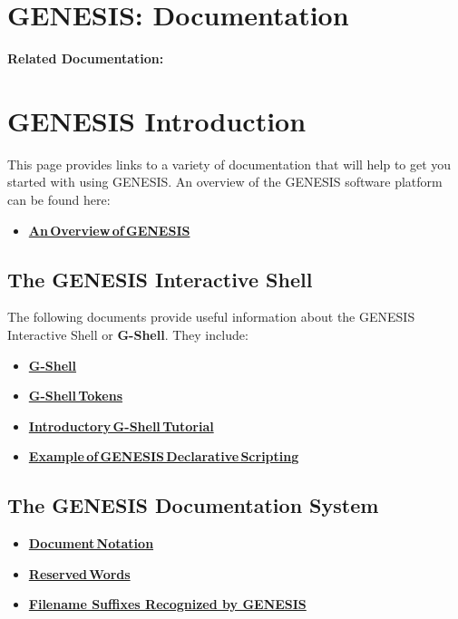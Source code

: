 \documentclass[12pt]{article}
\begin{document}
\section*{GENESIS: Documentation}

{\bf Related Documentation:}

\section*{GENESIS Introduction}

This page provides links to a variety of documentation that will help to get you started with using GENESIS. An overview of the GENESIS software platform can be found here:

\begin{itemize}
\item \href{../genesis-overview/genesis-overview.tex}{\bf An\,Overview\,of\,GENESIS}
\end{itemize}

\subsection*{The GENESIS Interactive Shell}

The following documents provide useful information about the GENESIS Interactive Shell or {\bf G-Shell}. They include:

\begin{itemize}
\item \href{../gshell/gshell.tex}{\bf G-Shell}
\item \href{../shell-tokens/shell-tokens.tex}{\bf G-Shell\,Tokens}
\item \href{../tutorial1/tutorial1.tex}{\bf Introductory\,G-Shell\,Tutorial}
\item \href{../example-script1/example-script1.tex}{\bf Example\,of\,GENESIS\,Declarative\,Scripting}
\end{itemize}

\subsection*{The GENESIS Documentation System}
\begin{itemize}
\item \href{../document-notation/document-notation.tex}{\bf Document\,Notation}
\item \href{../reserved-words/reserved-words.tex}{\bf Reserved\,Words}
\item \href{../common-suffixes/common-suffixes.tex}{\bf Filename Suffixes Recognized by GENESIS} 
\end{itemize}
\end{document}
